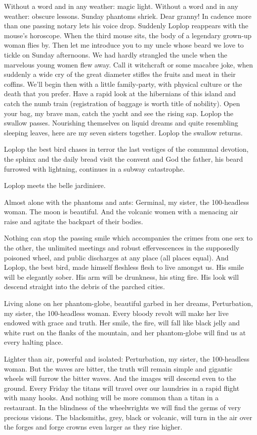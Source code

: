 \documentclass{essay}
\begin{document}
\begin{essaystyle}
Without a word and in any weather: magic light. Without a word and in any
weather: obscure lessons. Sunday phantoms shriek. Dear granny! In cadence more
than one passing notary lets his voice drop. Suddenly Loplop reappears with the
mouse's horoscope. When the third mouse sits, the body of a legendary grown-up
woman flies by. Then let me introduce you to my uncle whose beard we love to
tickle on Sunday afternoons. We had hardly strangled the uncle when the
marvelous young women flew away. Call it witchcraft or some macabre joke, when
suddenly a wide cry of the great diameter stifles the fruits and meat in their
coffins. We'll begin then with a little family-party, with physical culture or
the death that you prefer. Have a rapid look at the hibernians of this island
and catch the numb train (registration of baggage is worth title of nobility).
Open your bag, my brave man, catch the yacht and see the rising sap. Loplop the
swallow passes. Nourishing themselves on liquid dreams and quite resembling
sleeping leaves, here are my seven sisters together. Loplop the swallow
returns.

Loplop the best bird chases in terror the last vestiges of the communal
devotion, the sphinx and the daily bread visit the convent and God the father,
his beard furrowed with lightning, continues in a subway catastrophe.

Loplop meets the belle jardiniere.

Almost alone with the phantoms and ants: Germinal, my sister, the 100-headless
woman. The moon is beautiful. And the volcanic women with a menacing air raise
and agitate the backpart of their bodies.

Nothing can stop the passing smile which accompanies the crimes from one sex to
the other, the unlimited meetings and robust effervescences in the supposedly
poisoned wheel, and public discharges at any place (all places equal). And
Loplop, the best bird, made himself fleshless flesh to live amongst us. His
smile will be elegantly sober. His arm will be drunkness, his sting fire. His
look will descend straight into the debris of the parched cities.

Living alone on her phantom-globe, beautiful garbed in her dreams,
Perturbation, my sister, the 100-headless woman. Every bloody revolt will make
her live endowed with grace and truth. Her smile, the fire, will fall like
black jelly and white rust on the flanks of the mountain, and her phantom-globe
will find us at every halting place.

Lighter than air, powerful and isolated: Perturbation, my sister, the
100-headless woman.  But the waves are bitter, the truth will remain simple and
gigantic wheels will furrow the bitter waves. And the images will descend even
to the ground. Every Friday the titans will travel over our laundries in a
rapid flight with many hooks. And nothing will be more common than a titan in a
restaurant. In the blindness of the wheelwrights we will find the germs of very
precious visions. The blacksmiths, grey, black or volcanic, will turn in the
air over the forges and forge crowns even larger as they rise higher.


\end{essaystyle}
\end{document}
